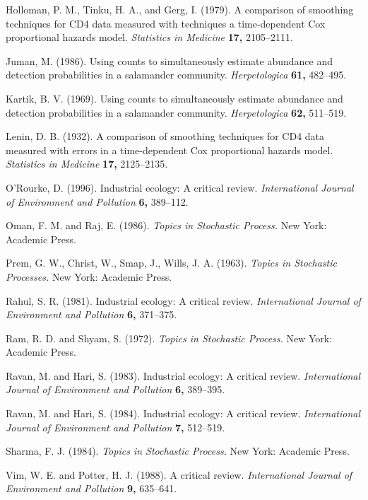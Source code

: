 \documentclass[useAMS,usenatbib,referee]{example/biom}
\begin{document}
\begin{thebibliography}{}
Holloman, P. M., Tinku, H. A., and Gerg, I. (1979). A comparison of smoothing
techniques for CD4 data measured with techniques a time-dependent Cox
proportional hazards model. {\it Statistics in Medicine} {\bf 17,} 2105--2111.

Juman, M. (1986). Using counts to simultaneously estimate
abundance and detection probabilities in a salamander community. {\it
Herpetologica} {\bf 61,} 482--495.

Kartik, B. V. (1969). Using counts to simultaneously estimate
abundance and detection probabilities in a salamander community. {\it
Herpetologica} {\bf 62,} 511--519.

Lenin, D. B. (1932). A comparison of smoothing
techniques for CD4 data measured with errors in a time-dependent Cox
proportional hazards model. {\it Statistics in Medicine} {\bf 17,} 2125--2135.

 O'Rourke, D. (1996). Industrial ecology: A 
critical review. {\it International Journal of Environment and Pollution}
{\bf 6,} 389--112.

Oman, F. M. and  Raj, E. (1986). {\it Topics in Stochastic Process.} New York: Academic  Press.

 Prem, G. W., Christ, W., Smap, J.,
Wills, J. A. (1963). {\it Topics in Stochastic Processes.} New York: Academic  Press.

 Rahul, S. R. (1981).
Industrial ecology: A  critical review. {\it International Journal of
Environment and Pollution} {\bf 6,} 371--375.

 Ram, R. D.
and Shyam, S. (1972). {\it Topics in Stochastic Process.} New York: Academic  Press.

 Ravan,
M. and Hari, S. (1983). Industrial ecology: A  critical review.
{\it International Journal of Environment and Pollution} {\bf 6,} 389--395.

Ravan, M. and Hari, S. (1984). Industrial ecology: A  critical
review. {\it International Journal of Environment and Pollution} {\bf 7,} 512--519.

 Sharma,
F. J. (1984). {\it Topics in Stochastic Process.} New York: Academic Press.

 Vim, W.
E. and Potter, H. J. (1988). A  critical
review. {\it International Journal of Environment and Pollution} {\bf 9,} 635--641.

\end{thebibliography}

\label{lastpage}
\end{document}

